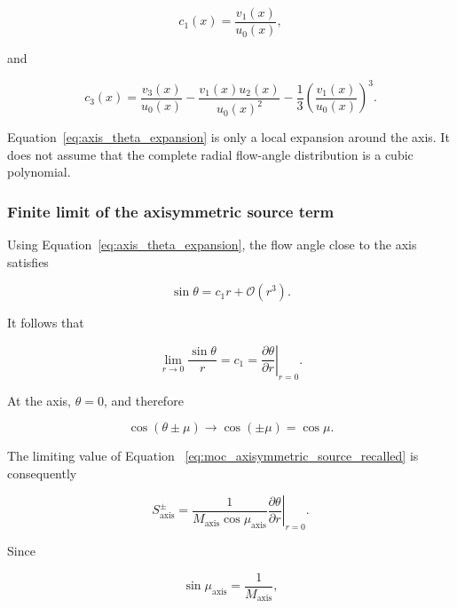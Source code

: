 \begin{equation}
c_1(x)=\frac{v_1(x)}{u_0(x)},
\end{equation}

and

\begin{equation}
c_3(x)
=
\frac{v_3(x)}{u_0(x)}
-
\frac{v_1(x)u_2(x)}{u_0(x)^2}
-
\frac{1}{3}
\left(
\frac{v_1(x)}{u_0(x)}
\right)^3.
\end{equation}

Equation~\eqref{eq:axis_theta_expansion} is only a local expansion
around the axis. It does not assume that the complete radial flow-angle
distribution is a cubic polynomial.

\subsubsection{Finite limit of the axisymmetric source term}

Using Equation~\eqref{eq:axis_theta_expansion}, the flow angle close to
the axis satisfies

\begin{equation}
\sin\theta
=
c_1r+\mathcal{O}(r^3).
\end{equation}

It follows that

\begin{equation}
\lim_{r\rightarrow0}
\frac{\sin\theta}{r}
=
c_1
=
\left.
\frac{\partial\theta}{\partial r}
\right|_{r=0}.
\label{eq:sin_theta_over_r_limit}
\end{equation}

At the axis, \(\theta=0\), and therefore

\begin{equation}
\cos(\theta\pm\mu)
\longrightarrow
\cos(\pm\mu)
=
\cos\mu.
\end{equation}

The limiting value of Equation~
\eqref{eq:moc_axisymmetric_source_recalled} is consequently

\begin{equation}
\boxed{
S^\pm_{\mathrm{axis}}
=
\frac{1}
{M_{\mathrm{axis}}\cos\mu_{\mathrm{axis}}}
\left.
\frac{\partial\theta}{\partial r}
\right|_{r=0}
}.
\label{eq:S_axis_first_form}
\end{equation}

Since

\begin{equation}
\sin\mu_{\mathrm{axis}}
=
\frac{1}{M_{\mathrm{axis}}},
\end{equation}

